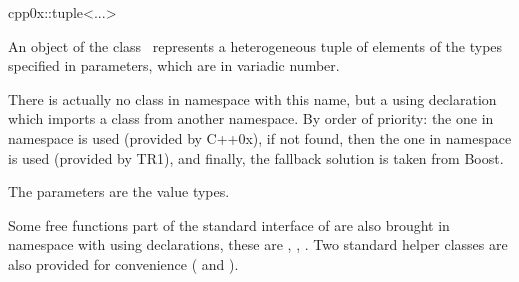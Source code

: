 

\begin{ccRefClass}{cpp0x::tuple<...>}

\ccDefinition

An object of the class \ccClassTemplateName\ represents a heterogeneous tuple of elements
of the types specified in parameters, which are in variadic number.

There is actually no class in namespace  with this name, but a using declaration which
imports a class from another namespace.  By order of priority: the one in namespace
 is used (provided by C++0x), if not found, then the one in namespace
 is used (provided by TR1), and finally, the fallback solution 
is taken from Boost.


  \ccParameters

  The parameters  are the value types.


Some free functions part of the standard interface of  are also
brought in namespace  with using declarations, these are ,
, . 
Two standard helper classes are also provided for convenience ( and ).

\end{ccRefClass}

\ccParDims
